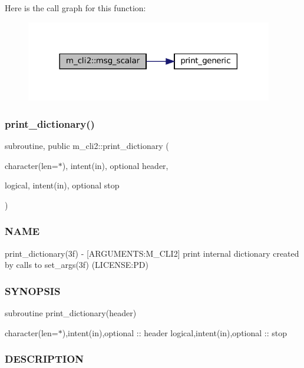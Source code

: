 Here is the call graph for this function\+:\nopagebreak
\begin{figure}[H]
\begin{center}
\leavevmode
\includegraphics[width=306pt]{namespacem__cli2_a737dc863a63dc101338840baad1cfd17_cgraph}
\end{center}
\end{figure}
\mbox{\label{namespacem__cli2_af7dc9c4b19e394533df4a8ef42fa111b}} 
\subsubsection{\texorpdfstring{print\+\_\+dictionary()}{print\_dictionary()}}
{\footnotesize\ttfamily subroutine, public m\+\_\+cli2\+::print\+\_\+dictionary (\begin{DoxyParamCaption}\item[{character(len=$\ast$), intent(in), optional}]{header,  }\item[{logical, intent(in), optional}]{stop }\end{DoxyParamCaption})}



\subsubsection*{N\+A\+ME}

print\+\_\+dictionary(3f) -\/ \mbox{[}A\+R\+G\+U\+M\+E\+N\+TS\+:M\+\_\+\+C\+L\+I2\mbox{]} print internal dictionary created by calls to set\+\_\+args(3f) (L\+I\+C\+E\+N\+SE\+:PD) \subsubsection*{S\+Y\+N\+O\+P\+S\+IS}

subroutine print\+\_\+dictionary(header)

character(len=$\ast$),intent(in),optional \+:\+: header logical,intent(in),optional \+:\+: stop \subsubsection*{D\+E\+S\+C\+R\+I\+P\+T\+I\+ON}

